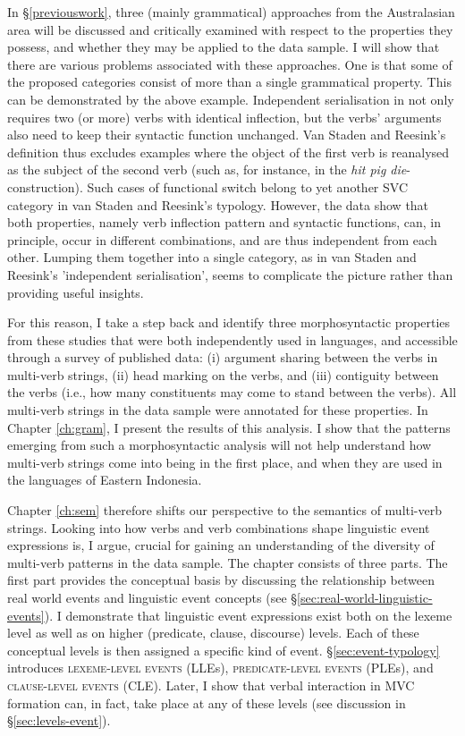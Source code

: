 In §\ref{previouswork}, three (mainly grammatical) approaches from the Australasian area will be discussed and critically examined with respect to the properties they possess, and whether they may be applied to the data sample. I will show that there are various problems associated with these approaches. One is that some of the proposed categories consist of more than a single grammatical property. This can be demonstrated by the above example. Independent serialisation in \citet{vanstaden2008serial} not only requires two (or more) verbs with identical inflection, but the verbs' arguments also need to keep their syntactic function unchanged. Van Staden and Reesink's definition thus excludes examples where the object of the first verb is reanalysed as the subject of the second verb (such as, for instance, in the \textit{hit pig die}-construction). Such cases of functional switch belong to yet another SVC category in van Staden and Reesink's typology. However, the data show that both properties, namely verb inflection pattern and syntactic functions, can, in principle, occur in different combinations, and are thus independent from each other. Lumping them together into a single category, as in van Staden and Reesink's 'independent serialisation', seems to complicate the picture rather than providing useful insights. 

For this reason, I take a step back and identify three morphosyntactic properties from these studies that were both independently used in languages, and accessible through a survey of published data: (i) argument sharing between the verbs in multi-verb strings, (ii) head marking on the verbs, and (iii) contiguity between the verbs (i.e., how many constituents may come to stand between the verbs). All multi-verb strings in the data sample were annotated for these properties. In Chapter \ref{ch:gram}, I present the results of this analysis. I show that the patterns emerging from such a morphosyntactic analysis will not help understand how multi-verb strings come into being in the first place, and when they are used in the languages of Eastern Indonesia.

Chapter \ref{ch:sem} therefore shifts our perspective to the semantics of multi-verb strings. Looking into how verbs and verb combinations shape linguistic event expressions is, I argue, crucial for gaining an understanding of the diversity of multi-verb patterns in the data sample. The chapter consists of three parts. The first part provides the conceptual basis by discussing the relationship between real world events and linguistic event concepts (see §\ref{sec:real-world-linguistic-events}). I demonstrate that linguistic event expressions exist both on the lexeme level as well as on higher (predicate, clause, discourse) levels. Each of these conceptual levels is then assigned a specific kind of event. §\ref{sec:event-typology} introduces \textsc{lexeme-level events} (LLEs), \textsc{predicate-level events} (PLEs), and \textsc{clause-level events} (CLE). Later, I show that verbal interaction in MVC formation can, in fact, take place at any of these levels (see discussion in §\ref{sec:levels-event}). 

